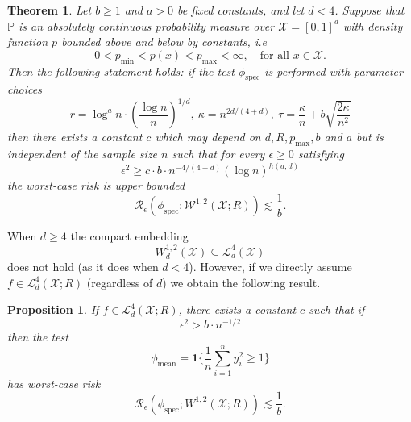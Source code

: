 \documentclass{article}
\newcommand{\1}{\mathbf{1}}
\newcommand{\Pbb}{\mathbb{P}}
\newcommand{\spec}{\mathrm{spec}}
\theoremstyle{alden}
\theoremstyle{aldenthm}
\newtheorem{theorem}{Theorem}
\newtheorem{proposition}{Proposition}
\theoremstyle{definition}
\theoremstyle{remark}
\begin{document}
\begin{theorem}
	\label{thm:sobolev_testing_rate}
	Let $b \geq 1$ and $a > 0$ be fixed constants, and let $d < 4$. Suppose that $\Pbb$ is an absolutely continuous probability measure over $\mathcal{X} = [0,1]^d$ with density function $p$ bounded above and below by constants, i.e
	\begin{equation*}
	0 < p_{\min} < p(x) < p_{\max} < \infty, \quad \textrm{for all $x \in \mathcal{X}$.}
	\end{equation*}
	Then the following statement holds: if the test $\phi_{\spec}$ is performed with parameter choices 
	\begin{equation*}
	r = \log^a n \cdot \left(\frac{\log n}{n}\right)^{1/d}, ~\kappa = n^{2d/(4 + d)}, ~\tau = \frac{\kappa}{n} + b\sqrt{\frac{2\kappa}{n^2}}
	\end{equation*}
	then there exists a constant $c$ which may depend on $d,R,p_{\max},b$ and $a$ but is independent of the sample size $n$ such that for every $\epsilon \geq 0$ satisfying
	\begin{equation}
	\label{eqn:sobolev_testing_rate}
	\epsilon^2 \geq c \cdot b \cdot n^{-4/(4 + d)} (\log n)^{h(a,d)}
	\end{equation}
	the worst-case risk is upper bounded
	\begin{equation}
	\label{eqn:sobolev_testing_rate_1}
	\mathcal{R}_{\epsilon}(\phi_{\mathrm{spec}}; \mathcal{W}^{1,2}(\mathcal{X};R)) \lesssim \frac{1}{b}.
	\end{equation}
\end{theorem}

When $d \geq 4$ the compact embedding
\begin{equation*}
W_d^{1,2}(\mathcal{X}) \subseteq \mathcal{L}_d^4(\mathcal{X}) 
\end{equation*}
does not hold (as it does when $d < 4$). However, if we directly assume $f \in \mathcal{L}_d^4(\mathcal{X};R)$ (regardless of $d$) we obtain the following result.
\begin{proposition}
	\label{prop:L4_testing_rate}
	If $f \in \mathcal{L}_d^4(\mathcal{X};R)$, there exists a constant $c$ such that if
	\begin{equation}
	\label{eqn:L4_testing_rate}
	\epsilon^2 > b \cdot n^{-1/2}
	\end{equation}
	then the test
	\begin{equation*}
	\phi_{\mathrm{mean}} = \1\{\frac{1}{n}\sum_{i = 1}^{n} y_i^2 \geq 1\}
	\end{equation*}
	has worst-case risk
	\begin{equation*}
	\mathcal{R}_{\epsilon}(\phi_{\mathrm{spec}}; W^{1,2}(\mathcal{X};R)) \lesssim \frac{1}{b}. 
	\end{equation*}
\end{proposition}
\end{document}
